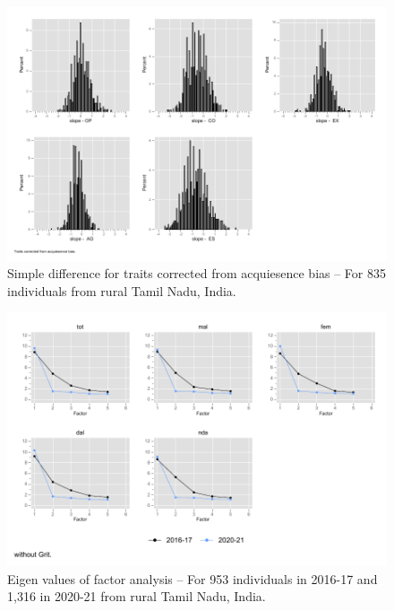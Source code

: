 \documentclass[a4paper, 12pt, onecolumn]{article}
\begin{document}
\begin{figure}[!h]
\raggedright
\includegraphics[scale=0.8]{INPUT/diffcont_cor}
\caption{Simple difference for traits corrected from acquiesence bias -- For 835 individuals from rural Tamil Nadu, India.}
\label{fig:diffcor}
\end{figure}


\begin{figure}[!h]
\raggedright
\includegraphics[scale=0.8]{INPUT/eigen_without}
\caption{Eigen values of factor analysis -- For 953 individuals in 2016-17 and 1,316 in 2020-21 from rural Tamil Nadu, India.}
\label{fig:eigen}
\end{figure}
\end{document}
